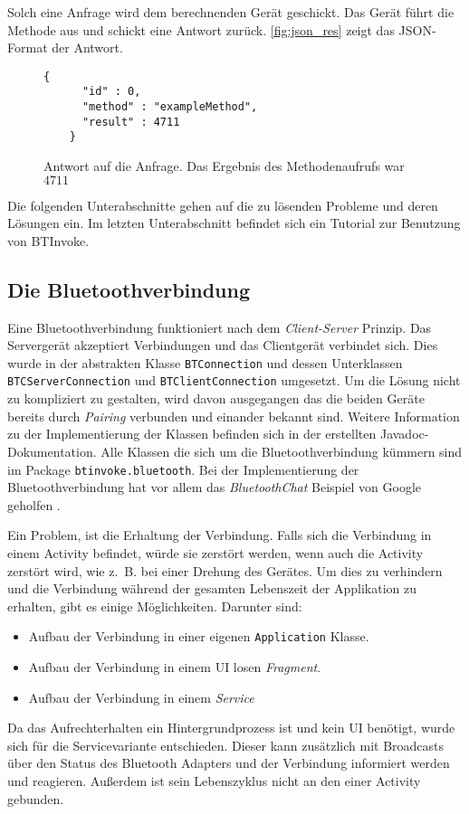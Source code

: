 Solch eine Anfrage wird dem berechnenden Gerät geschickt. Das Gerät führt die Methode aus und schickt eine Antwort zurück. \autoref{fig:json_res} zeigt das JSON-Format der Antwort.
\begin{figure}[htb]
  \centering
  \begin{lstlisting}[basicstyle=\ttfamily\scriptsize]
    {
      "id" : 0,
      "method" : "exampleMethod",
      "result" : 4711
    }
  \end{lstlisting}
  \caption{Antwort auf die Anfrage. Das Ergebnis des Methodenaufrufs war $4711$}
  \label{fig:json_res}
\end{figure}

Die folgenden Unterabschnitte gehen auf die zu lösenden Probleme und deren Lösungen ein. Im letzten Unterabschnitt befindet sich ein Tutorial zur Benutzung von BTInvoke. 
%
\subsection{Die Bluetoothverbindung}
%
\begin{sloppypar}
Eine Bluetoothverbindung funktioniert nach dem \emph{Client-Server} Prinzip. Das Servergerät akzeptiert Verbindungen und das Clientgerät verbindet sich. Dies wurde in der abstrakten Klasse \lstinline|BTConnection| und dessen Unterklassen \lstinline|BTCServerConnection| und \lstinline|BTClientConnection| umgesetzt. Um die Lösung nicht zu kompliziert zu gestalten, wird davon ausgegangen das die beiden Geräte bereits durch \emph{Pairing} verbunden und einander bekannt sind. Weitere Information zu der Implementierung der Klassen befinden sich in der erstellten Javadoc-Dokumentation. Alle Klassen die sich um die Bluetoothverbindung kümmern sind im Package \lstinline|btinvoke.bluetooth|. Bei der Implementierung der Bluetoothverbindung hat vor allem das \emph{BluetoothChat} Beispiel von Google geholfen \cite{GoogleInc.2014}.
\end{sloppypar}

Ein Problem, ist die Erhaltung der Verbindung. Falls sich die Verbindung in einem Activity befindet, würde sie zerstört werden, wenn auch die Activity zerstört wird, wie z.~B. bei einer Drehung des Gerätes. Um dies zu verhindern und die Verbindung während der gesamten Lebenszeit der Applikation zu erhalten, gibt es einige Möglichkeiten. Darunter sind:
\begin{itemize}
  \item Aufbau der Verbindung in einer eigenen \lstinline|Application| Klasse.
  \item Aufbau der Verbindung in einem UI losen \emph{Fragment}.~\cite{GoogleInc.2015a}
  \item Aufbau der Verbindung in einem \emph{Service}
\end{itemize}
Da das Aufrechterhalten ein Hintergrundprozess ist und kein UI benötigt, wurde sich für die Servicevariante entschieden. Dieser kann zusätzlich mit Broadcasts über den Status des Bluetooth Adapters und der Verbindung informiert werden und reagieren. Außerdem ist sein Lebenszyklus nicht an den einer Activity gebunden.

